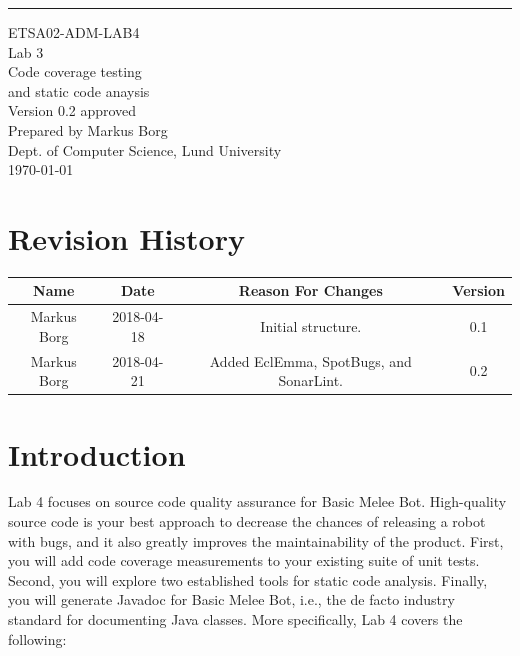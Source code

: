 \documentclass{scrreprt}
\date{}
\def\myversion{0.2 }
\begin{document}
\begin{flushright}
    \rule{16cm}{5pt}\vskip1cm
    \begin{bfseries}
    	\LARGE{ETSA02-ADM-LAB4}\\
    	\vspace{1.5cm}
        \Huge{Lab 3}\\
        \vspace{0.5cm}
        Code coverage testing\\
        \vspace{0.5cm}
        and static code anaysis\\
        \vspace{1.5cm}
        \LARGE{Version \myversion approved}\\
        \vspace{1.5cm}
        Prepared by Markus Borg\\
        Dept. of Computer Science, Lund University\\
        \vspace{1.5cm}
        \today\\
    \end{bfseries}
\end{flushright}


\chapter*{Revision History}

\begin{center}
    \begin{tabular}{|c|c|c|c|}
        \hline
	    Name & Date & Reason For Changes & Version\\
        \hline
	    Markus Borg & 2018-04-18 & Initial structure. & 0.1\\
        \hline
        Markus Borg & 2018-04-21 & Added EclEmma, SpotBugs, and SonarLint. & 0.2\\
        \hline
    \end{tabular}
\end{center}

\chapter{Introduction}
Lab 4 focuses on source code quality assurance for Basic Melee Bot. High-quality source code is your best approach to decrease the chances of releasing a robot with bugs, and it also greatly improves the maintainability of the product. First, you will add code coverage measurements to your existing suite of unit tests. Second, you will explore two established tools for static code analysis. Finally, you will generate Javadoc for Basic Melee Bot, i.e., the de facto industry standard for documenting Java classes. More specifically, Lab 4 covers the following:
\end{document}
